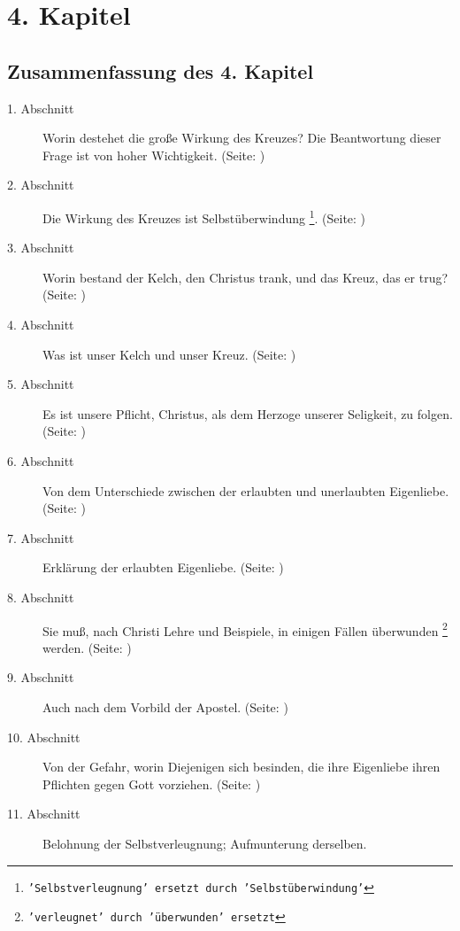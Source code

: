 

\chapter{4. Kapitel} \label{kap4}

\section{Zusammenfassung des 4. Kapitel}
\footnotesize
\begin{description}
\item[1. Abschnitt] Worin destehet die große Wirkung des Kreuzes? Die
Beantwortung dieser Frage ist von hoher Wichtigkeit.
(Seite: \pageref{kap4_ab1})
\item[2. Abschnitt] Die Wirkung des Kreuzes ist Selbstüberwindung
\footnote{\texttt{'Selbstverleugnung' ersetzt durch 'Selbstüberwindung'}}.
(Seite: \pageref{kap4_ab2})
\item[3. Abschnitt] Worin bestand der Kelch, den Christus trank, und das Kreuz,
das er trug? (Seite: \pageref{kap4_ab3})
\item[4. Abschnitt]  Was ist unser Kelch und unser Kreuz. (Seite:
\pageref{kap4_ab4})
\item[5. Abschnitt] Es ist unsere Pflicht, Christus, als dem Herzoge unserer
Seligkeit, zu folgen. (Seite: \pageref{kap4_ab5})
\item[6. Abschnitt] Von dem Unterschiede zwischen der erlaubten und unerlaubten
Eigenliebe. (Seite: \pageref{kap4_ab6})
\item[7. Abschnitt] Erklärung der erlaubten Eigenliebe. (Seite:
\pageref{kap4_ab7})
\item[8. Abschnitt] Sie muß, nach Christi Lehre und Beispiele, in einigen Fällen
überwunden \footnote{\texttt{'verleugnet' durch 'überwunden' ersetzt}} werden.
(Seite: \pageref{kap4_ab8})
\item[9. Abschnitt] Auch nach dem Vorbild der Apostel. (Seite:
\pageref{kap4_ab9})
\item[10. Abschnitt] Von der Gefahr, worin Diejenigen sich besinden, die ihre
Eigenliebe ihren Pflichten gegen Gott vorziehen. (Seite: \pageref{kap4_ab10})
\item[11. Abschnitt] Belohnung der Selbstverleugnung; Aufmunterung derselben.

\end{description}
